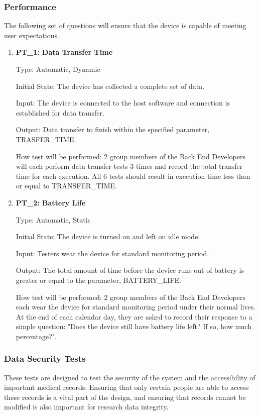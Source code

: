 \documentclass[12pt, titlepage]{article}
\begin{document}
\pagebreak
\subsubsection{Performance}
The following set of questions will ensure that the device is capable of meeting user expectations.
\begin{enumerate}
\item\textbf{{PT\_1: Data Transfer Time\\}}\label{PT1}

Type: Automatic, Dynamic
					
Initial State: The device has collected a complete set of data.
					
Input: The device is connected to the host software and connection is established for data transfer.
					
Output: Data transfer to finish within the specified parameter, TRASFER\_TIME.
					
How test will be performed: 2 group members of the Back End Developers will each perform data transfer tests 3 times and record the total transfer time for each execution. All 6 tests should result in execution time less than or equal to TRANSFER\_TIME.

\item\textbf{{PT\_2: Battery Life\\}}\label{PT2}

Type: Automatic, Static
					
Initial State: The device is turned on and left on idle mode.
					
Input: Testers wear the device for standard monitoring period.
					
Output: The total amount of time before the device runs out of battery is greater or equal to the parameter, BATTERY\_LIFE.
					
How test will be performed: 2 group members of the Back End Developers each wear the device for standard monitoring period under their normal lives. At the end of each calendar day, they are asked to record their response to a simple question: "Does the device still have battery life left? If so, how much percentage?". 

\end{enumerate}
\pagebreak
\subsubsection{Data Security Tests}

These tests are designed to test the security of the system and the accessibility of important medical records. Ensuring that only certain people are able to access these records is a vital part of the design, and ensuring that records cannot be modified is also important for research data integrity. 
\end{document}

